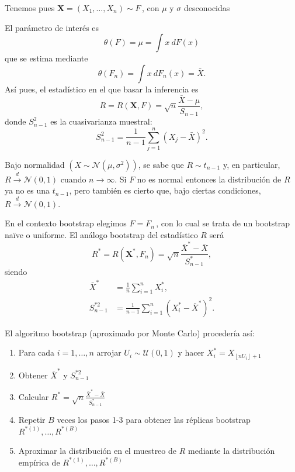 \documentclass[]{book}
\theoremstyle{definition}
\theoremstyle{definition}
\theoremstyle{definition}
\theoremstyle{remark}
\begin{document}
Tenemos pues \(\mathbf{X}=\left( X_1,\ldots ,X_n \right) \sim F\,\), con
\(\mu\) y \(\sigma\) desconocidas

El parámetro de interés es
\[\theta \left( F \right) =\mu =\int x~dF\left( x \right)\] que se
estima mediante
\[\theta \left( F_n \right) =\int x~dF_n\left( x \right) =\bar{X}.\] Así
pues, el estadístico en el que basar la inferencia es
\[R=R\left( \mathbf{X},F \right) =\sqrt{n}\frac{\bar{X}-\mu }{S_{n-1}},\]
donde \(S_{n-1}^2\) es la cuasivarianza muestral:
\[S_{n-1}^2=\frac{1}{n-1}\sum_{j=1}^{n}\left( X_j-\bar{X} \right)^2.\]

Bajo normalidad
\(\left( X\sim \mathcal{N}\left( \mu ,\sigma^2 \right) \right)\), se
sabe que \(R\sim t_{n-1}\) y, en particular,
\(R\overset{d}{\rightarrow } \mathcal{N}\left( 0,1 \right)\) cuando
\(n\rightarrow \infty\). Si \(F\) no es normal entonces la distribución
de \(R\) ya no es una \(t_{n-1}\), pero también es cierto que, bajo
ciertas condiciones,
\(R\overset{d}{\rightarrow}\mathcal{N}\left(0,1 \right)\).

En el contexto bootstrap elegimos \(\hat{F}=F_n\,\), con lo cual se
trata de un bootstrap naïve o uniforme. El análogo bootstrap del
estadístico \(R\) será
\[R^{\ast}=R\left( \mathbf{X}^{\ast},F_n \right) =\sqrt{n}\frac{
\bar{X}^{\ast}-\bar{X}}{S_{n-1}^{\ast}},\] siendo \[\begin{aligned}
\bar{X}^{\ast} &= \frac{1}{n}\sum_{i=1}^{n}X_i^{\ast}, \\
S_{n-1}^{\ast 2} &= \frac{1}{n-1}\sum_{i=1}^{n}\left( X_i^{\ast}-
\bar{X}^{\ast} \right)^2.
\end{aligned}\]

El algoritmo bootstrap (aproximado por Monte Carlo) procedería así:

\begin{enumerate}
\def\labelenumi{\arabic{enumi}.}
\item
  Para cada \(i=1,\ldots ,n\) arrojar
  \(U_i\sim \mathcal{U}\left( 0,1 \right)\) y hacer
  \(X_i^{\ast}=X_{\left\lfloor nU_i\right\rfloor +1}\)
\item
  Obtener \(\bar{X}^{\ast}\) y \(S_{n-1}^{\ast 2}\)
\item
  Calcular
  \(R^{\ast}=\sqrt{n}\frac{\bar{X}^{\ast}-\bar{X}}{ S_{n-1}^{\ast}}\)
\item
  Repetir \(B\) veces los pasos 1-3 para obtener las réplicas bootstrap
  \(R^{\ast (1)}, \ldots, R^{\ast (B)}\)
\item
  Aproximar la distribución en el muestreo de \(R\) mediante la
  distribución empírica de \(R^{\ast (1)}, \ldots, R^{\ast (B)}\)
\end{enumerate}
\end{document}
